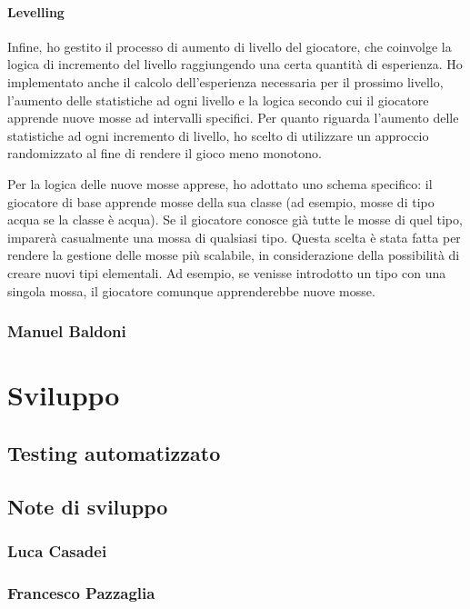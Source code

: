 \documentclass[a4paper,12pt]{report}
\begin{document}
\subsubsection{Levelling}
Infine, ho gestito il processo di aumento di livello del giocatore, che coinvolge la logica di incremento del livello raggiungendo una certa quantità di esperienza. Ho implementato anche il calcolo dell'esperienza necessaria per il prossimo livello, l'aumento delle statistiche ad ogni livello e la logica secondo cui il giocatore apprende nuove mosse ad intervalli specifici.
Per quanto riguarda l'aumento delle statistiche ad ogni incremento di livello, ho scelto di utilizzare un approccio randomizzato al fine di rendere il gioco meno monotono.

Per la logica delle nuove mosse apprese, ho adottato uno schema specifico: il giocatore di base apprende mosse della sua classe (ad esempio, mosse di tipo acqua se la classe è acqua). Se il giocatore conosce già tutte le mosse di quel tipo, imparerà casualmente una mossa di qualsiasi tipo. Questa scelta è stata fatta per rendere la gestione delle mosse più scalabile, in considerazione della possibilità di creare nuovi tipi elementali. Ad esempio, se venisse introdotto un tipo con una singola mossa, il giocatore comunque apprenderebbe nuove mosse.

\subsection*{Manuel Baldoni}


\chapter{Sviluppo}

\section{Testing automatizzato}
\section{Note di sviluppo}

\subsection*{Luca Casadei}

\subsection*{Francesco Pazzaglia}
\end{document}
